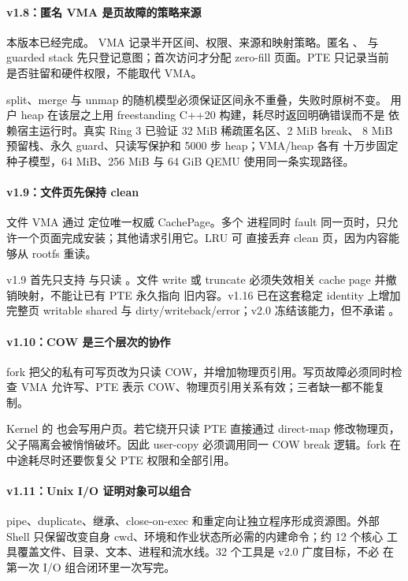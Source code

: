 \paragraph{v1.8：匿名 VMA 是页故障的策略来源}

本版本已经完成。
VMA 记录半开区间、权限、来源和映射策略。匿名 、 与
guarded stack 先只登记意图；首次访问才分配 zero-fill 页面。PTE 只记录当前
是否驻留和硬件权限，不能取代 VMA。

split、merge 与 unmap 的随机模型必须保证区间永不重叠，失败时原树不变。
用户 heap 在该层之上用 freestanding C++20 构建，耗尽时返回明确错误而不是
依赖宿主运行时。真实 Ring 3 已验证 32 MiB 稀疏匿名区、2 MiB break、
8 MiB 预留栈、永久 guard、只读写保护和 5000 步 heap；VMA/heap 各有
十万步固定种子模型，64 MiB、256 MiB 与 64 GiB QEMU 使用同一条实现路径。

\paragraph{v1.9：文件页先保持 clean}

文件 VMA 通过  定位唯一权威 CachePage。多个
进程同时 fault 同一页时，只允许一个页面完成安装；其他请求引用它。LRU 可
直接丢弃 clean 页，因为内容能够从 rootfs 重读。

v1.9 首先只支持  与只读 。文件 write
或 truncate 必须失效相关 cache page 并撤销映射，不能让已有 PTE 永久指向
旧内容。v1.16 已在这套稳定 identity 上增加完整页 writable shared 与
dirty/writeback/error；v2.0 冻结该能力，但不承诺 。

\paragraph{v1.10：COW 是三个层次的协作}

fork 把父的私有可写页改为只读 COW，并增加物理页引用。写页故障必须同时检查
VMA 允许写、PTE 表示 COW、物理页引用关系有效；三者缺一都不能复制。

Kernel 的  也会写用户页。若它绕开只读 PTE 直接通过
direct-map 修改物理页，父子隔离会被悄悄破坏。因此 user-copy 必须调用同一
COW break 逻辑。fork 在中途耗尽时还要恢复父 PTE 权限和全部引用。

\paragraph{v1.11：Unix I/O 证明对象可以组合}

pipe、duplicate、继承、close-on-exec 和重定向让独立程序形成资源图。外部
Shell 只保留改变自身 cwd、环境和作业状态所必需的内建命令；约 12 个核心
工具覆盖文件、目录、文本、进程和流水线。32 个工具是 v2.0 广度目标，不必
在第一次 I/O 组合闭环里一次写完。

